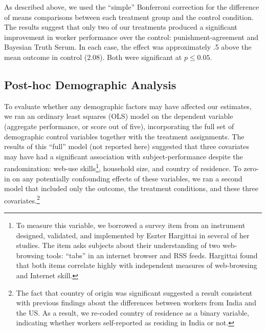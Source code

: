 \documentclass{cscw2010}
\begin{document}
As described above, we used the ``simple'' Bonferroni correction for
the difference of means comparisons between each treatment group and
the control condition. The results suggest that only two of our
treatments produced a significant improvement in worker performance
over the control: punishment-agreement and Bayesian Truth Serum. In
each case, the effect was approximately .5 above the mean outcome in
control (2.08). Both were significant at $p \leq0.05$.


\subsection{Post-hoc Demographic Analysis}
To evaluate whether any demographic factors may have
affected our estimates, we ran an ordinary least squares (OLS) model
on the dependent variable (aggregate performance, or score out of five), incorporating
the full set of demographic control variables together with the
treatment assignments. The results of this ``full'' model (not
reported here) suggested that three covariates may have had a
significant association with subject-performance despite the
randomization: web-use skills\footnote{To measure this variable, we
  borrowed a survey item from an instrument designed, validated, and
  implemented by Eszter Hargittai in several of her
  studies.\cite{hargittai2009update} The item asks subjects about
  their understanding of two web-browsing tools: ``tabs'' in an
  internet browser and RSS feeds. Hargittai found that both items
  correlate highly with independent measures of web-browsing and
  Internet skill.}, household size, and country of residence. To
zero-in on any potentially confounding effects of these variables, we
ran a second model that included only the outcome, the treatment
conditions, and these three covariates.\footnote{The fact that country
  of origin was significant suggested a result consistent with
  previous findings about the differences between workers from India
  and the US\cite{ipeirotis2010}. As a result, we re-coded country
  of residence as a binary variable, indicating whether workers
  self-reported as residing in India or not.}
\end{document}
